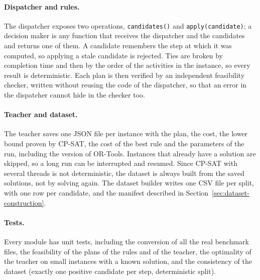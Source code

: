 \paragraph{Dispatcher and rules.} The dispatcher exposes two operations, \texttt{candidates()}
and \texttt{apply(candidate)}; a decision maker is any function that receives the dispatcher and
the candidates and returns one of them. A candidate remembers the step at which it was computed,
so applying a stale candidate is rejected. Ties are broken by completion time and then by the
order of the activities in the instance, so every result is deterministic. Each plan is then
verified by an independent feasibility checker, written without reusing the code of the
dispatcher, so that an error in the dispatcher cannot hide in the checker too.

\paragraph{Teacher and dataset.} The teacher saves one JSON file per instance with the plan, the
cost, the lower bound proven by CP-SAT, the cost of the best rule and the parameters of the run,
including the version of OR-Tools. Instances that already have a solution are skipped, so a long
run can be interrupted and resumed. Since CP-SAT with several threads is not deterministic, the
dataset is always built from the saved solutions, not by solving again. The dataset builder
writes one CSV file per split, with one row per candidate, and the manifest described in
Section~\ref{sec:dataset-construction}.

\paragraph{Tests.} Every module has unit tests, including the conversion of all the real
benchmark files, the feasibility of the plans of the rules and of the teacher, the optimality of
the teacher on small instances with a known solution, and the consistency of the dataset (exactly
one positive candidate per step, deterministic split).
